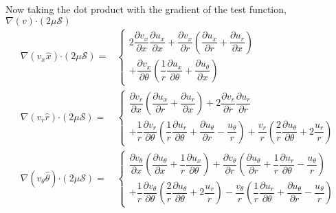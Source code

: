 \documentclass{kthreport}
\newcommand{\bigcdot}{\bm{\cdot}}
\begin{document}
Now taking the dot product with the gradient of the test function, $\nabla (v)\bigcdot(2\mu\mathcal{S})$
\begin{subequations}
\begin{eqnarray}
	\nabla(v_{x}\hat{x})\bigcdot(2\mu\mathcal{S}) = & \left\{
	\begin{split}
	2\dfrac{\partial v_{x}}{\partial x}\dfrac{\partial u_{x}}{\partial x} 
	+ \dfrac{\partial v_{x}}{\partial r}\left(\dfrac{\partial u_{x}}{\partial r} + \dfrac{\partial u_{r}}{\partial x}	\right) \\
	+ \dfrac{\partial v_{x}}{\partial \theta}\left(\dfrac{1}{r}\dfrac{\partial u_{x}}{\partial \theta} + \dfrac{\partial u_{\theta}}{\partial x} \right) 
		\end{split} \right. \\
	\nabla(v_{r}\hat{r})\bigcdot(2\mu\mathcal{S}) = & \left\{
	\begin{split}
	\dfrac{\partial v_{r}}{\partial x}\left(\dfrac{\partial u_{x}}{\partial r} + \dfrac{\partial u_{r}}{\partial x} \right)
	+ 2\dfrac{\partial v_{r}}{\partial r}\dfrac{\partial u_{r}}{\partial r} \\
	+ \dfrac{1}{r}\dfrac{\partial v_{r}}{\partial \theta}\left(\dfrac{1}{r}\dfrac{\partial u_{r}}{\partial \theta} + \dfrac{\partial u_{\theta}}{\partial r} - \dfrac{u_{\theta}}{r} \right) 
	+ \dfrac{v_{r}}{r}\left(\dfrac{2}{r}\dfrac{\partial u_{\theta}}{\partial \theta} + 2\dfrac{u_{r}}{r}	\right)
		\end{split}\right. \\
	\nabla(v_{\theta}\hat{\theta})\bigcdot(2\mu\mathcal{S}) =&  \left\{
	\begin{split}
	\dfrac{\partial v_{\theta}}{\partial x}\left(\dfrac{\partial u_{\theta}}{\partial x} + \dfrac{1}{r}\dfrac{\partial u_{x}}{\partial \theta} \right) 
	+ \dfrac{\partial v_{\theta}}{\partial r}\left(\dfrac{\partial u_{\theta}}{\partial r} + \dfrac{1}{r}\dfrac{\partial u_{r}}{\partial \theta} - \dfrac{u_{\theta}}{r}	\right) \\
	+ \dfrac{1}{r}\dfrac{\partial v_{\theta}}{\partial \theta}\left(\dfrac{2}{r}\dfrac{\partial u_{\theta}}{\partial \theta} + 2\dfrac{u_{r}}{r}	\right)
	- \dfrac{v_{\theta}}{r} \left(\dfrac{1}{r}\dfrac{\partial u_{r}}{\partial \theta} + \dfrac{\partial u_{\theta}}{\partial r} - \dfrac{u_{\theta}}{r} \right) 
	\end{split}\right.
\end{eqnarray}
\end{subequations}
\end{document}
